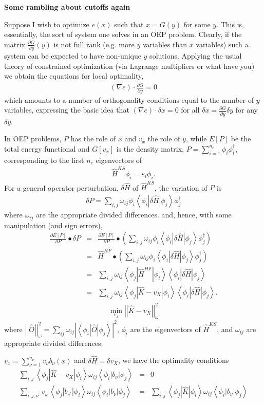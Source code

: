 \documentclass{article}
\newcommand{\beas}{\begin{eqnarray*}}
\newcommand{\enas}{\end{eqnarray*}}
\newcommand{\paren}[1]{\left({#1}\right)}
\newcommand{\norm}[1]{\left|\left|{#1}\right|\right|}
\newcommand{\inp}[1]{\left<{#1}\right>}
\begin{document}
{\bf Some rambling about cutoffs again}

Suppose I wish to optimize $e(x)$ such that $x = G(y)$ for some $y$.
This is, essentially, the sort of system one solves in an OEP problem.
Clearly, if the matrix
$\frac{\partial G}{\partial y}(y)$ is not full rank (e.g.
more $y$ variables than $x$ variables) such a system can be expected
to have non-unique $y$ solutions.  Applying the usual theory of
constrained optimization (via Lagrange multipliers or what have you)
we obtain the equations for local optimality,
\beas
(\nabla e) \cdot \frac{\partial G}{\partial y} = 0
\enas
which amounts to a number of orthogonality conditions equal to the
number of $y$ variables, expressing the basic idea that
$(\nabla e) \cdot \delta x = 0$ for all
$\delta x = \frac{\partial G}{\partial y} \delta y$ for any $\delta y$.

In OEP problems, $P$ has the role of $x$ and $v_x$ the role of $y$,
while $E[P]$ be the total energy functional and
$G[v_x]$ is the density matrix,
$P = \sum_{i=1}^{n_e} \phi_i \phi_i^\dagger$,
corresponding to the first $n_e$ eigenvectors of
\beas
\hat{H}^{KS} \phi_i = \varepsilon_i \phi_i.
\enas
For a general operator perturbation, $\delta \hat{H}$ of $\hat{H}^{KS}$,
the variation of $P$ is
\beas
\delta P =
 \sum_{i,j} \omega_{ij} \phi_i
 \inp{\phi_i \left|\delta \hat{H}\right| \phi_j}
 \phi_j^\dagger
\enas
where $\omega_{ij}$ are the appropriate divided differences.
and, hence, with some manipulation (and sign errors),
\beas
\frac{\partial E[P]}{\partial P} \bullet \delta P
 &=&
 \frac{\partial E[P]}{\partial P}
 \bullet
 \paren{
 \sum_{i,j} 
 \omega_{ij}\phi_i \inp{\phi_i \left|\delta \hat{H}\right| \phi_j}
 \phi_j^\dagger
 }\\
 &=&
 \hat{H}^{HF}
 \bullet
 \paren{
 \sum_{i,j} 
 \omega_{ij} \phi_i \inp{\phi_i \left|\delta \hat{H}\right| \phi_j}
 \phi_j^\dagger
 }\\
 &=&
 \sum_{i,j}
 \omega_{ij}
 \inp{\phi_j \left|\hat{H}^{HF}\right| \phi_i}
 \inp{\phi_i \left|\delta \hat{H}\right| \phi_j}
 \\
 &=&
 \sum_{i,j}
 \omega_{ij}
 \inp{\phi_j \left|\hat{K} - v_X\right| \phi_i}
 \inp{\phi_i \left|\delta \hat{H}\right| \phi_j}.
\enas
\beas
\min_{v_x} \norm{ \hat{K} - v_X }^2_{\omega}
\enas
where $\norm{ \hat{O} }^2_\omega =
 \sum_{ij} \omega_{ij} 
           \left| \inp{ \phi_i \left| \hat{O} \right| \phi_j} \right|^2$,
$\phi_i$ are the eigenvectors of $\hat{H}^{KS}$, and
$\omega_{ij}$ are appropriate divided differences.

$v_x = \sum_{\nu=1}^{n_\nu} v_\nu b_\nu(x)$
and $\delta \hat{H} = \delta v_X$, we have the optimality
conditions
\beas
 \sum_{i,j}
 \inp{\phi_j \left|\hat{K} - v_X\right| \phi_i}
 \omega_{ij}
 \inp{\phi_i \left|b_\nu \right| \phi_j}
  &=& 0\\
 \sum_{i,j,\nu^\prime}
 v_{\nu^\prime}
 \inp{\phi_j \left|b_{\nu^\prime}\right| \phi_i}
 \omega_{ij}
 \inp{\phi_i \left|b_\nu \right| \phi_j}
 &=&
 \sum_{i,j}
 \inp{\phi_j \left|\hat{K}\right| \phi_i}
 \omega_{ij}
 \inp{\phi_i \left|b_\nu \right| \phi_j}
\enas
\end{document}
